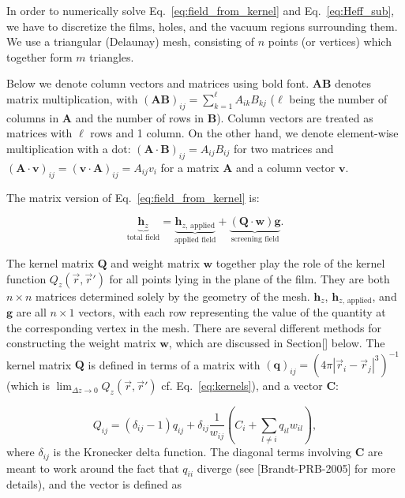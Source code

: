 \documentclass{article}
\begin{document}
In order to numerically solve Eq.~\ref{eq:field_from_kernel} and Eq.~\ref{eq:Heff_sub}, we have to discretize the films, holes, and the vacuum regions surrounding them. We use a triangular
(Delaunay) mesh, consisting of $n$ points (or vertices)
which together form $m$ triangles.

Below we denote column vectors and matrices using bold font. $\mathbf{A}\mathbf{B}$
denotes matrix multiplication, with $(\mathbf{A}\mathbf{B})_{ij}=\sum_{k=1}^\ell A_{ik}B_{kj}$
($\ell$ being the number of columns in $\mathbf{A}$ and the number of rows in $\mathbf{B}$). Column vectors are treated as matrices with $\ell$ rows and 1 column. On the other hand, we denote element-wise multiplication with a dot: $(\mathbf{A}\cdot\mathbf{B})_{ij}=A_{ij}B_{ij}$ for two matrices
and $(\mathbf{A}\cdot\mathbf{v})_{ij}=(\mathbf{v}\cdot\mathbf{A})_{ij}=A_{ij}v_{i}$ for a matrix $\mathbf{A}$ and a column vector $\mathbf{v}$.

The matrix version of Eq.~\ref{eq:field_from_kernel} is:

\begin{equation}
    \label{eq:field_from_kernel_num}
    \underbrace{\mathbf{h}_z}_\text{total field}
    = \underbrace{\mathbf{h}_{z,\,\mathrm{applied}}}_\text{applied field}
    + \underbrace{(\mathbf{Q}\cdot\mathbf{w})\mathbf{g}}_\text{screening field}.
\end{equation}

The kernel matrix $\mathbf{Q}$ and weight matrix $\mathbf{w}$ together play the role of the
kernel function $Q_z(\vec{r},\vec{r}')$ for all points lying in the plane of the film. They are both $n\times n$ matrices determined solely by the geometry of the mesh.
$\mathbf{h}_z$, $\mathbf{h}_{z,\,\mathrm{applied}}$, and $\mathbf{g}$ are all $n\times 1$ vectors, with each row representing the value of the quantity at the
corresponding vertex in the mesh. There are several different methods for constructing the weight matrix $\mathbf{w}$, which are discussed in Section[] below. The kernel
matrix $\mathbf{Q}$ is defined in terms of a matrix with
$(\mathbf{q})_{ij} = \left(4\pi|\vec{r}_i-\vec{r}_j|^3\right)^{-1}$
(which is $\lim_{\Delta z\to 0}Q_z(\vec{r},\vec{r}')$ cf. Eq.~\ref{eq:kernels}),
and a vector $\mathbf{C}$:

\begin{equation}
    \label{eq:kernel_matrix}
    Q_{ij} = (\delta_{ij}-1)q_{ij}
    + \delta_{ij}\frac{1}{w_{ij}}\left(C_i + \sum_{l\neq i}q_{il}w_{il}\right),
\end{equation}
where $\delta_{ij}$ is the Kronecker delta function. The diagonal terms involving $\mathbf{C}$ are meant to work around the fact that $q_{ii}$ diverge (see [Brandt-PRB-2005] for more details), and the vector is defined as
\end{document}
